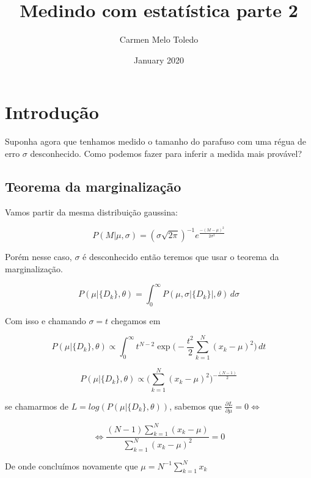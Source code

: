 \documentclass{article}
\title{Medindo com estatística parte 2}
\author{Carmen Melo Toledo}
\date{January 2020}
\begin{document}
\maketitle

\section{Introdução}

Suponha agora que tenhamos medido o tamanho do parafuso com uma régua de erro $\sigma$ desconhecido.
Como podemos fazer para inferir a medida mais provável?

\subsection{Teorema da marginalização}
Vamos partir da mesma distribuição gaussina:

\begin{equation}
    P(M|\mu, \sigma) = (\sigma \sqrt{2\pi})^{-1} e^{\frac{-(M-\mu)^2}{2\sigma^2}}
\end{equation}

Porém nesse caso, $\sigma$ é desconhecido então teremos que usar o teorema da marginalização. 

\begin{equation}
    P(\mu|\{D_k\}, \theta) = \int_0^\infty P(\mu,\sigma|\{D_k\}|, \theta) \, d\sigma
\end{equation}

Com isso e chamando $\sigma = t$ chegamos em

\begin{equation*}
    P(\mu|\{D_k\}, \theta) \propto \int_0^\infty \! t^{N-2}\exp{ \Big( -\frac{t^2}{2}\sum_{k=1}^N (x_k-\mu)^2 \Big) } \, dt
\end{equation*}

\begin{equation*}
    P(\mu|\{D_k\}, \theta) \propto \Big( \sum_{k=1}^N(x_k-\mu)^2 \Big)^{-\frac{(N-1)}{2}}
\end{equation*}

    se chamarmos de $L = log(P(\mu|\{D_k\}, \theta))$, sabemos que $\frac{\partial L}{\partial \mu} = 0 \iff$
    
    \begin{equation*}
        \iff \frac{(N-1) \sum_{k=1}^N (x_k - \mu)}{\sum_{k=1}^N(x_k - \mu)^2} = 0
    \end{equation*}
    
    De onde concluímos novamente que $\mu = N^{-1}\sum_{k=1}^N x_k$
\end{document}
